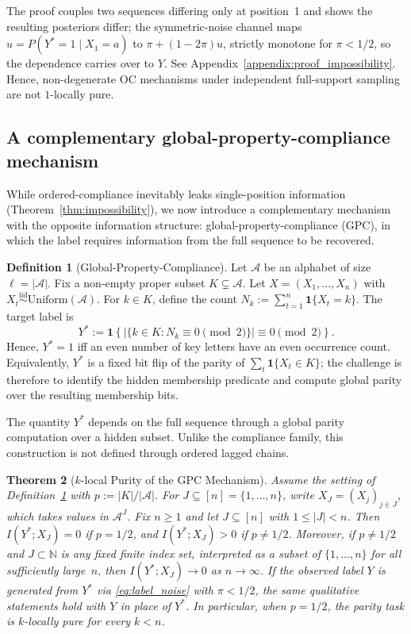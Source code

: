 \documentclass[fullpaper]{nldl}
\theoremstyle{plain}
\newtheorem{theorem}{Theorem}[section]
\theoremstyle{definition}
\newtheorem{definition}[theorem]{Definition}
\theoremstyle{remark}
\begin{document}
The proof couples two sequences differing only at position~1 and shows the resulting posteriors differ; the symmetric-noise channel maps \(u=P(Y^*=1\mid X_1=a)\) to \(\pi+(1-2\pi)u\), strictly monotone for \(\pi<1/2\), so the dependence carries over to \(Y\). See Appendix~\ref{appendix:proof_impossibility}. Hence, non-degenerate OC mechanisms under independent full-support sampling are not $1$-locally pure.

\subsection{A complementary global-property-compliance mechanism}
\label{sec:parity}
While ordered-compliance inevitably leaks single-position information (Theorem~\ref{thm:impossibility}), we now introduce a complementary mechanism with the opposite information structure: global-property-compliance (GPC), in which the label requires information from the full sequence to be recovered.

\begin{definition}[Global-Property-Compliance]
\label{def:parity}
Let $\mathcal{A}$ be an alphabet of size $\ell = |\mathcal{A}|$. Fix a non-empty proper subset $K \subsetneq \mathcal{A}$.
Let $X = (X_1,\ldots,X_n)$ with $X_t \overset{\mathrm{iid}}{\sim} \mathrm{Uniform}(\mathcal{A})$.
For $k \in K$, define the count $N_k := \sum_{t=1}^n \mathbf{1}\{X_t = k\}$.
The target label is
\[
Y^* := \mathbf{1}\!\left\{
\left|\{k\in K : N_k \equiv 0 \pmod 2\}\right|
\equiv 0 \pmod 2
\right\}.
\]
Hence, $Y^* = 1$ iff an even number of key letters have an even occurrence count. Equivalently, \(Y^*\) is a fixed bit flip of the parity of $\sum_t \mathbf{1}\{X_t\in K\}$; the challenge is therefore to identify the hidden membership predicate and compute global parity over the resulting membership bits.
\end{definition}

The quantity $Y^*$ depends on the full sequence through a global parity computation over a hidden subset. Unlike the compliance family, this construction is not defined through ordered lagged chains.

\begin{theorem}[$k$-local Purity of the GPC Mechanism]
\label{thm:parity_local_purity}
Assume the setting of Definition~\ref{def:parity} with
$p := |K|/|\mathcal{A}|$. For \(J\subseteq [n] = \{1, \ldots, n\}\), write
\(X_J=(X_j)_{j\in J}\), which takes values in \(\mathcal A^J\).
Fix $n\ge 1$ and let
$J \subseteq [n]$ with $1 \le |J| < n$. Then $I(Y^*;X_J)=0$ if $p = 1/2$, and $I(Y^*;X_J)>0$ if $p \neq 1/2$. Moreover, if $p\neq 1/2$ and $J\subset \mathbb{N}$ is any fixed finite index set, interpreted as a subset of $\{1,\ldots,n\}$ for all sufficiently large~$n$, then $I(Y^*;X_J)\to 0$ as
$n\to\infty$. If the observed label $Y$ is generated from $Y^*$ via
\eqref{eq:label_noise} with $\pi<1/2$, the same qualitative statements hold with $Y$ in place of $Y^*$. In particular, when $p=1/2$, the parity task is $k$-locally pure for every $k<n$.
\end{theorem}
\end{document}
